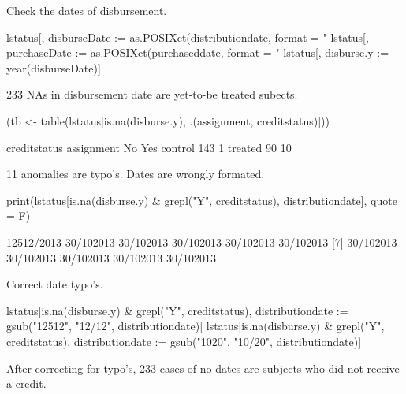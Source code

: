 Check the dates of disbursement.
\begin{Schunk}
\begin{Sinput}
lstatus[, disburseDate := as.POSIXct(distributiondate, format = "%d/%m/%Y")]
lstatus[, purchaseDate := as.POSIXct(purchaseddate, format = "%d/%m/%Y")]
lstatus[, disburse.y := year(disburseDate)]
\end{Sinput}
\end{Schunk}

233 NAs in disbursement date are yet-to-be treated subects. 
\begin{Schunk}
\begin{Sinput}
(tb <- table(lstatus[is.na(disburse.y), .(assignment, creditstatus)]))
\end{Sinput}
\begin{Soutput}
          creditstatus
assignment  No Yes
   control 143   1
   treated  90  10
\end{Soutput}
\end{Schunk}
11 anomalies are typo's. Dates are wrongly formated.
\begin{Schunk}
\begin{Sinput}
print(lstatus[is.na(disburse.y) & grepl("Y", creditstatus), distributiondate], quote = F)
\end{Sinput}
\begin{Soutput}
 [1] 12512/2013 30/102013  30/102013  30/102013  30/102013  30/102013 
 [7] 30/102013  30/102013  30/102013  30/102013  30/102013 
\end{Soutput}
\end{Schunk}
Correct date typo's.
\begin{Schunk}
\begin{Sinput}
lstatus[is.na(disburse.y) & grepl("Y", creditstatus), 
	distributiondate := gsub("12512", "12/12", distributiondate)]
lstatus[is.na(disburse.y) & grepl("Y", creditstatus), 
	distributiondate := gsub("1020", "10/20", distributiondate)]
\end{Sinput}
\end{Schunk}

After correcting for typo's, 233 cases of no dates are subjects who did not receive a credit. 

